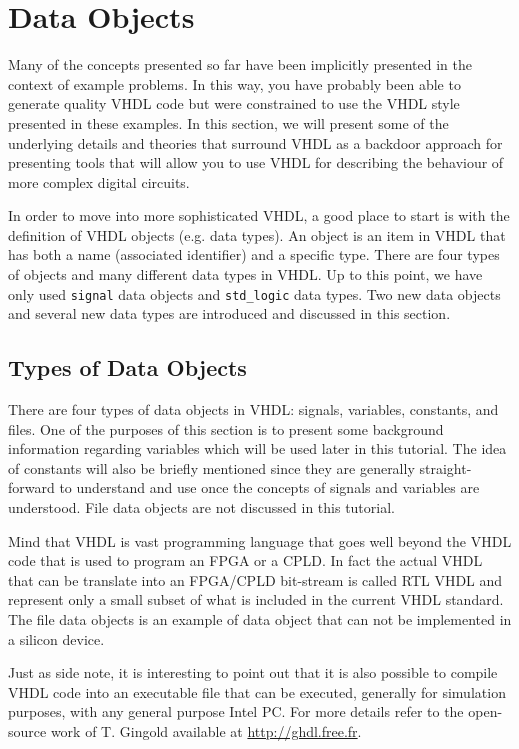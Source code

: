 %
%
%
\chapter{Data Objects}

Many of the concepts presented so far have been implicitly presented in the context of example problems. In this way, you have probably been able to generate quality VHDL code but were constrained to use the VHDL style presented in these examples. In this section, we will present some of the underlying details and theories that surround VHDL as a backdoor approach for presenting tools that will allow you to use VHDL for describing the behaviour of more complex digital circuits.

In order to move into more sophisticated VHDL, a good place to start is with the definition of VHDL objects (e.g. data types). An object is an item in VHDL that has both a name (associated identifier) and a specific type. There are four types of objects and many different data types in VHDL. Up to this point, we have only used \texttt{signal} data objects and \texttt{std\_logic} data types. Two new data objects and several new data types are introduced and discussed in this section.

\section{Types of Data Objects}
There are four types of data objects in VHDL: signals, variables, constants, and files. One of the purposes of this section is to present some background information regarding variables which will be used later in this tutorial. The idea of constants will also be briefly mentioned since they are generally straight-forward to understand and use once the concepts of signals and variables are understood. File data objects are not discussed in this tutorial. 

Mind that VHDL is vast programming language that goes well beyond the VHDL code that is used to program an FPGA or a CPLD. In fact the actual VHDL that can be translate into an FPGA/CPLD bit-stream is called RTL VHDL and represent only a small subset of what is included in the current VHDL standard. The file  data objects is an example of data object that can not be implemented in a silicon device.

Just as side note, it is interesting to point out that it is also possible to compile VHDL code into an executable file that can be executed, generally for simulation purposes, with any general purpose Intel PC. For more details refer to the open-source work of T. Gingold available at \url{http://ghdl.free.fr}.

